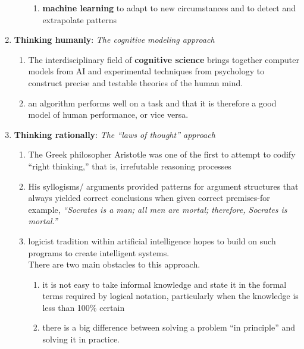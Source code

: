 \begin{enumerate}[itemsep=0.2cm]
\begin{enumerate}
\begin{enumerate}
            \item \textbf{machine learning} to adapt to new circumstances and to detect and extrapolate patterns
        \end{enumerate}
    \end{enumerate}

    \item \textbf{Thinking humanly}: \textit{The cognitive modeling approach} 
    \begin{enumerate}
        \item The interdisciplinary field of \textbf{cognitive science} brings together computer models from AI and experimental techniques from psychology to construct precise and testable theories of the human mind. 

        \item an algorithm performs well on a task and that it is therefore a good model of human performance, or vice versa.
    \end{enumerate}

    \item \textbf{Thinking rationally}: \textit{The “laws of thought” approach}
    \begin{enumerate}
        \item The Greek philosopher Aristotle was one of the first to attempt to codify “right thinking,” that is, irrefutable reasoning processes

        \item His syllogisms/ arguments provided patterns for argument structures that always yielded correct conclusions when given correct premises-for example, \textit{“Socrates is a man; all men are mortal; therefore, Socrates is mortal.”}

        \item logicist tradition within artificial intelligence hopes to build on such programs to create intelligent systems. \\
        There are two main obstacles to this approach.
        \begin{enumerate}
            \item it is not easy to take informal knowledge and state it in the formal terms required by logical notation, particularly when the knowledge is less than 100\% certain

            \item there is a big difference between solving a problem “in principle” and solving it in practice.
        \end{enumerate}
    \end{enumerate}


\end{enumerate}
